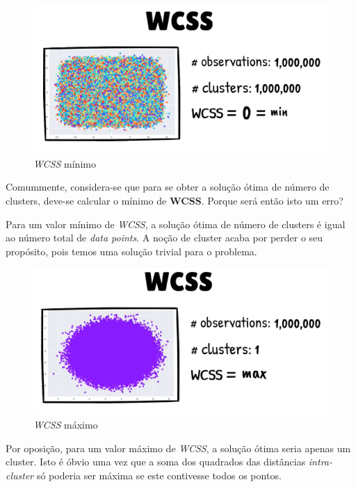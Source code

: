 \documentclass[12pt, a4paper, oneside]{scrreport}
\begin{document}
\begin{figure}
  \centering
  \includegraphics[scale=0.25]{wcss_global_minimize}
  \caption{\textit{WCSS} mínimo}
  \label{fig:wcss_min}
\end{figure}
  
\par Comummente, considera-se que para se obter a solução ótima de número de clusters, deve-se calcular o mínimo de \textbf{WCSS}. 
Porque será então isto um erro?

\par Para um valor mínimo de \textit{WCSS}, a solução ótima de número de clusters é igual ao número total de \textit{data points}. A noção de cluster acaba por perder o seu propósito, pois temos uma solução trivial para o problema.


\begin{figure}
  \centering
  \includegraphics[scale=0.25]{wcss_maximize}
  \caption{\textit{WCSS} máximo}
\end{figure}

\par Por oposição, para um valor máximo de \textit{WCSS}, a solução ótima seria apenas um cluster. Isto é óbvio uma vez que a soma dos quadrados das distâncias \textit{intra-cluster} só poderia ser máxima se este contivesse todos os pontos.
\end{document}
